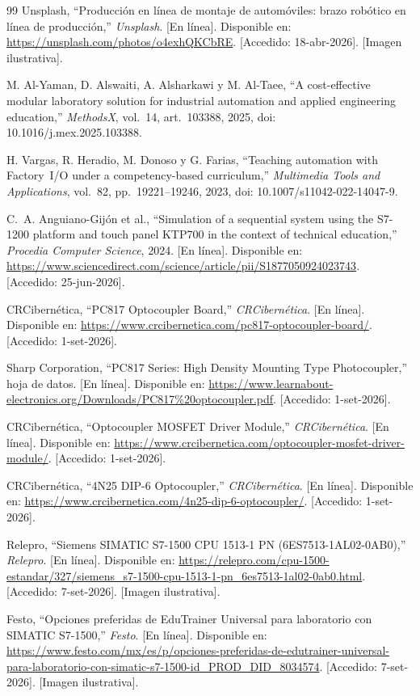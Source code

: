 \documentclass[12pt,a4paper,oneside]{report}
\begin{document}
\begin{thebibliography}{99}
Unsplash, ``Producción en línea de montaje de automóviles: brazo robótico en línea de producción,'' \emph{Unsplash}. [En línea]. Disponible en: \url{https://unsplash.com/photos/o4exhQKCbRE}. [Accedido: 18-abr-2026]. [Imagen ilustrativa].

M. Al-Yaman, D. Alswaiti, A. Alsharkawi y M. Al-Taee, ``A cost-effective modular laboratory
solution for industrial automation and applied engineering education,'' \emph{MethodsX},
vol.~14, art.~103388, 2025, doi: 10.1016/j.mex.2025.103388.

H. Vargas, R. Heradio, M. Donoso y G. Farias, ``Teaching automation with Factory~I/O under a
competency-based curriculum,'' \emph{Multimedia Tools and Applications}, vol.~82,
pp.~19221--19246, 2023, doi: 10.1007/s11042-022-14047-9.

C.~A. Anguiano-Gijón et al., ``Simulation of a sequential system using the S7-1200 platform
and touch panel KTP700 in the context of technical education,'' \emph{Procedia Computer
Science}, 2024. [En línea]. Disponible en:
\url{https://www.sciencedirect.com/science/article/pii/S1877050924023743}.
[Accedido: 25-jun-2026].

CRCibernética, ``PC817 Optocoupler Board,'' \emph{CRCibernética}. [En línea]. Disponible en:
\url{https://www.crcibernetica.com/pc817-optocoupler-board/}. [Accedido: 1-set-2026].

Sharp Corporation, ``PC817 Series: High Density Mounting Type Photocoupler,'' hoja de datos.
[En línea]. Disponible en:
\url{https://www.learnabout-electronics.org/Downloads/PC817\%20optocoupler.pdf}.
[Accedido: 1-set-2026].

CRCibernética, ``Optocoupler MOSFET Driver Module,'' \emph{CRCibernética}. [En línea]. Disponible en:
\url{https://www.crcibernetica.com/optocoupler-mosfet-driver-module/}. [Accedido: 1-set-2026].

CRCibernética, ``4N25 DIP-6 Optocoupler,'' \emph{CRCibernética}. [En línea]. Disponible en:
\url{https://www.crcibernetica.com/4n25-dip-6-optocoupler/}. [Accedido: 1-set-2026].

Relepro, ``Siemens SIMATIC S7-1500 CPU 1513-1 PN (6ES7513-1AL02-0AB0),'' \emph{Relepro}. [En línea].
Disponible en:
\url{https://relepro.com/cpu-1500-estandar/327/siemens_s7-1500-cpu-1513-1-pn_6es7513-1al02-0ab0.html}.
[Accedido: 7-set-2026]. [Imagen ilustrativa].

Festo, ``Opciones preferidas de EduTrainer Universal para laboratorio con SIMATIC S7-1500,''
\emph{Festo}. [En línea]. Disponible en:
\url{https://www.festo.com/mx/es/p/opciones-preferidas-de-edutrainer-universal-para-laboratorio-con-simatic-s7-1500-id_PROD_DID_8034574}.
[Accedido: 7-set-2026]. [Imagen ilustrativa].


\end{thebibliography}
\end{document}
